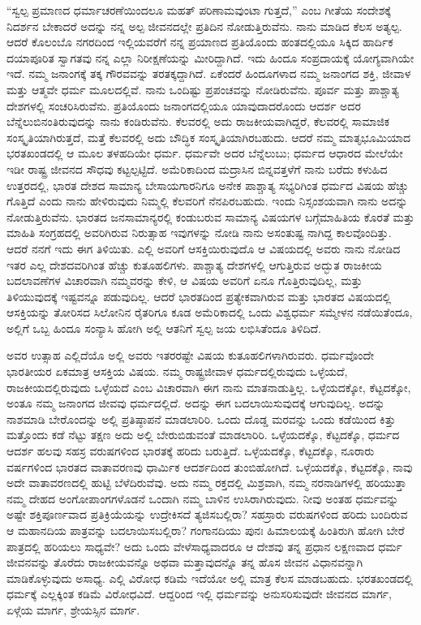 “ಸ್ವಲ್ಪ ಪ್ರಮಾಣದ ಧರ್ಮಾಚರಣೆಯಿಂದಲೂ ಮಹತ್​ ಪರಿಣಾಮವುಂಟಾ ಗುತ್ತದೆ,” ಎಂಬ ಗೀತೆಯ ಸಂದೇಶಕ್ಕೆ ನಿದರ್ಶನ ಬೇಕಾದರೆ ಅದನ್ನು ನನ್ನ ಅಲ್ಪ ಜೀವನದಲ್ಲೇ ಪ್ರತಿದಿನ ನೋಡುತ್ತಿರುವೆನು. ನಾನು ಮಾಡಿದ ಕೆಲಸ ಅತ್ಯಲ್ಪ. ಆದರೆ ಕೊಲಂಬೊ ನಗರದಿಂದ ಇಲ್ಲಿಯವರೆಗೆ ನನ್ನ ಪ್ರಯಾಣದ ಪ್ರತಿಯೊಂದು ಹಂತದಲ್ಲಿಯೂ ಸಿಕ್ಕಿದ ಹಾರ್ದಿಕ ದಯಾಪೂರಿತ ಸ್ವಾಗತವು ನನ್ನ ಎಲ್ಲಾ ನಿರೀಕ್ಷಣೆಯನ್ನು ಮೀರಿದ್ದಾಗಿದೆ. ಇದು ಹಿಂದೂ ಸಂಪ್ರದಾಯಕ್ಕೆ ಯೋಗ್ಯವಾಗಿಯೇ ಇದೆ. ನಮ್ಮ ಜನಾಂಗಕ್ಕೆ ತಕ್ಕ ಗೌರವವನ್ನು ತರತಕ್ಕದ್ದಾಗಿದೆ. ಏಕೆಂದರೆ ಹಿಂದೂಗಳಾದ ನಮ್ಮ ಜನಾಂಗದ ಶಕ್ತಿ, ಜೀವಾಳ ಮತ್ತು ಆತ್ಮವೇ ಧರ್ಮ ಮೂಲದಲ್ಲಿವೆ. ನಾನು ಒಂದಿಷ್ಟು ಪ್ರಪಂಚವನ್ನು ನೋಡಿರುವೆನು. ಪೂರ್ವ ಮತ್ತು ಪಾಶ್ಚಾತ್ಯ ದೇಶಗಳಲ್ಲಿ ಸಂಚರಿಸಿರುವೆನು. ಪ್ರತಿಯೊಂದು ಜನಾಂಗದಲ್ಲಿಯೂ ಯಾವುದಾದರೊಂದು ಆದರ್ಶ ಅದರ ಬೆನ್ನೆಲುಬಿನಂತಿರುವುದನ್ನು ನಾನು ಕಂಡಿರುವೆನು. ಕೆಲವರಲ್ಲಿ ಅದು ರಾಜಕೀಯವಾಗಿದ್ದರೆ, ಕೆಲವರಲ್ಲಿ ಸಾಮಾಜಿಕ ಸಂಸ್ಕೃತಿಯಾಗಿರುತ್ತದೆ, ಮತ್ತೆ ಕೆಲವರಲ್ಲಿ ಅದು ಬೌದ್ಧಿಕ ಸಂಸ್ಕೃತಿಯಾಗಿರಬಹುದು. ಆದರೆ ನಮ್ಮ ಮಾತೃಭೂಮಿಯಾದ ಭರತಖಂಡದಲ್ಲಿ ಆ ಮೂಲ ತಳಹದಿಯೇ ಧರ್ಮ. ಧರ್ಮವೇ ಅದರ ಬೆನ್ನೆಲುಬು; ಧರ್ಮದ ಆಧಾರದ ಮೇಲೆಯೇ ಇಡೀ ರಾಷ್ಟ್ರ ಜೀವನದ ಸೌಧವು ಕಟ್ಟಲ್ಪಟ್ಟಿದೆ. ಅಮೆರಿಕಾದಿಂದ ಮದ್ರಾಸಿನ ಬಿನ್ನವತ್ತಳೆಗೆ ನಾನು ಬರೆದು ಕಳುಹಿದ ಉತ್ತರದಲ್ಲಿ, ಭಾರತ ದೇಶದ ಸಾಮಾನ್ಯ ಬೇಸಾಯಗಾರನಿಗೂ ಅನೇಕ ಪಾಶ್ಚಾತ್ಯ ಸಭ್ಯರಿಗಿಂತ ಧರ್ಮದ ವಿಷಯ ಹೆಚ್ಚು ಗೊತ್ತಿದೆ ಎಂದು ನಾನು ಹೇಳಿರುವುದು ನಿಮ್ಮಲ್ಲಿ ಕೆಲವರಿಗೆ ನೆನಪಿರಬಹುದು. ಇಂದು ನಿಸ್ಸಂಶಯವಾಗಿ ನಾನು ಅದನ್ನು ನೋಡುತ್ತಿರುವೆನು. ಭಾರತದ ಜನಸಾಮಾನ್ಯರಲ್ಲಿ ಕಂಡುಬರುವ ಸಾಮಾನ್ಯ ವಿಷಯಗಳ ಬಗ್ಗೆ\break ಮಾಹಿತಿಯ ಕೊರತೆ ಮತ್ತು ಮಾಹಿತಿ ಸಂಗ್ರಹದಲ್ಲಿ ಅವರಿಗಿರುವ ನಿರುತ್ಸಾಹ ಇವುಗಳನ್ನು ನೋಡಿ ನಾನು ಅಸಂತುಷ್ಟ ನಾಗಿದ್ದ ಕಾಲವೊಂದಿತ್ತು. ಆದರೆ ನನಗೆ ಇದು ಈಗ ತಿಳಿಯಿತು. ಎಲ್ಲಿ ಅವರಿಗೆ ಆಸಕ್ತಿಯಿರುವುದೊ ಆ ವಿಷಯದಲ್ಲಿ ಅವರು ನಾನು ನೋಡಿದ ಇತರ ಎಲ್ಲ ದೇಶದವರಿಗಿಂತ ಹೆಚ್ಚು ಕುತೂಹಲಿಗಳು. ಪಾಶ್ಚಾತ್ಯ ದೇಶಗಳಲ್ಲಿ ಆಗುತ್ತಿರುವ ಅದ್ಭುತ ರಾಜಕೀಯ ಬದಲಾವಣೆಗಳ ವಿಚಾರವಾಗಿ ನಮ್ಮವರನ್ನು ಕೇಳಿ, ಆ ವಿಷಯ ಅವರಿಗೆ ಏನೂ ಗೊತ್ತಿರುವುದಿಲ್ಲ, ಮತ್ತು ತಿಳಿಯುವುದಕ್ಕೆ ಇಷ್ಟವನ್ನೂ ಪಡುವುದಿಲ್ಲ. ಆದರೆ ಭಾರತದಿಂದ ಪ್ರತ್ಯೇಕವಾಗಿರುವ ಮತ್ತು ಭಾರತದ ವಿಷಯದಲ್ಲಿ ಆಸಕ್ತಿಯನ್ನು ತೋರಿಸದ ಸಿಲೋನಿನ ರೈತರಿಗೂ ಕೂಡ ಅಮೆರಿಕಾದಲ್ಲಿ ಒಂದು ವಿಶ್ವಧರ್ಮ ಸಮ್ಮೇಳನ ನಡೆಯಿತೆಂದೂ, ಅಲ್ಲಿಗೆ ಒಬ್ಬ ಹಿಂದೂ ಸಂನ್ಯಾಸಿ ಹೋಗಿ ಅಲ್ಲಿ ಆತನಿಗೆ ಸ್ವಲ್ಪ ಜಯ ಲಭಿಸಿತೆಂದೂ ತಿಳಿದಿದೆ. 

ಅವರ ಉತ್ಸಾಹ ಎಲ್ಲಿದೆಯೊ ಅಲ್ಲಿ ಅವರು ಇತರರಷ್ಟೇ ವಿಷಯ ಕುತೂಹಲಿಗಳಾಗಿರುವರು. ಧರ್ಮವೊಂದೇ ಭಾರತೀಯರ ಏಕಮಾತ್ರ ಆಸಕ್ತಿಯ ವಿಷಯ. ನಮ್ಮ ರಾಷ್ಟ್ರಜೀವಾಳ ಧರ್ಮದಲ್ಲಿರುವುದು ಒಳ್ಳೆಯದೆ, ರಾಜಕೀಯದಲ್ಲಿರುವುದು ಒಳ್ಳೆಯದೆ ಎಂಬ ವಿಚಾರವಾಗಿ ಈಗ ನಾನು ಮಾತನಾಡುತ್ತಿಲ್ಲ. ಒಳ್ಳೆಯದಕ್ಕೋ, ಕೆಟ್ಟದಕ್ಕೋ, ಅಂತೂ ನಮ್ಮ ಜನಾಂಗದ ಜೀವವು ಧರ್ಮದಲ್ಲಿದೆ. ಅದನ್ನು ಈಗ ಬದಲಾಯಿಸುವುದಕ್ಕೆ ಆಗುವುದಿಲ್ಲ. ಅದನ್ನು ನಾಶಮಾಡಿ ಬೇರೊಂದನ್ನು ಅಲ್ಲಿ ಪ್ರತಿಷ್ಠಾಪನೆ ಮಾಡಲಾರಿರಿ. ಒಂದು ದೊಡ್ಡ ಮರವನ್ನು ಒಂದು ಕಡೆಯಿಂದ ಕಿತ್ತು ಮತ್ತೊಂದು ಕಡೆ ನೆಟ್ಟು ತಕ್ಷಣ ಅದು ಅಲ್ಲಿ ಬೇರುಬಿಡುವಂತೆ ಮಾಡಲಾರಿರಿ. ಒಳ್ಳೆಯದಕ್ಕೊ, ಕೆಟ್ಟದಕ್ಕೊ, ಧರ್ಮದ ಆದರ್ಶ ಹಲವು ಸಹಸ್ರ ವರುಷಗಳಿಂದ ಭಾರತಕ್ಕೆ ಹರಿದು ಬರುತ್ತಿದೆ. ಒಳ್ಳೆಯದಕ್ಕೊ, ಕೆಟ್ಟದಕ್ಕೊ, ನೂರಾರು ವರ್ಷಗಳಿಂದ ಭಾರತದ ವಾತಾವರಣವು ಧಾರ್ಮಿಕ ಆದರ್ಶದಿಂದ ತುಂಬಿಹೋಗಿದೆ. ಒಳ್ಳೆಯದಕ್ಕೊ, ಕೆಟ್ಟದಕ್ಕೊ, ನಾವು ಅದೇ ವಾತಾವರಣದಲ್ಲಿ ಹುಟ್ಟಿ ಬೆಳೆದಿರುವೆವು. ಅದು ನಮ್ಮ ರಕ್ತದಲ್ಲಿ ಮಿಶ್ರವಾಗಿ, ನಮ್ಮ ನರನಾಡಿಗಳಲ್ಲಿ ಹರಿಯುತ್ತಾ ನಮ್ಮ ದೇಹದ ಅಂಗೋಪಾಂಗಗಳೊಡನೆ ಒಂದಾಗಿ ನಮ್ಮ ಬಾಳಿನ ಉಸಿರಾಗಿರುವುದು. ನೀವು ಅಂತಹ ಧರ್ಮವನ್ನು ಅಷ್ಟೇ ಶಕ್ತಿಪೂರ್ಣವಾದ ಪ್ರತಿಕ್ರಿಯೆಯನ್ನು ಉದ್ರೇಕಿಸದೆ ತ್ಯಜಿಸಬಲ್ಲಿರಾ? ಸಹಸ್ರಾರು ವರುಷಗಳಿಂದ ಹರಿದು ಬಂದಿರುವ ಆ ಮಹಾನದಿಯ ಪಾತ್ರವನ್ನು ಬದಲಾಯಿಸಬಲ್ಲಿರಾ? ಗಂಗಾನದಿಯು ಪುನಃ ಹಿಮಾಲಯಕ್ಕೆ ಹಿಂತಿರುಗಿ ಹೋಗಿ ಬೇರೆ ಪಾತ್ರದಲ್ಲಿ ಹರಿಯಲು ಸಾಧ್ಯವೇ? ಅದು ಒಂದು ವೇಳೆ\break ಸಾಧ್ಯವಾದರೂ ಆ ದೇಶವು ತನ್ನ ಪ್ರಧಾನ ಲಕ್ಷಣವಾದ ಧರ್ಮ ಜೀವನವನ್ನು ತೊರೆದು ರಾಜಕೀಯವನ್ನೊ ಅಥವಾ ಮತ್ತಾವುದನ್ನೊ ತನ್ನ ಹೊಸ ಜೀವನ ವಿಧಾನವನ್ನಾಗಿ ಮಾಡಿಕೊಳ್ಳುವುದು ಅಸಾಧ್ಯ. ಎಲ್ಲಿ ವಿರೋಧ ಕಡಿಮೆ ಇದೆಯೋ ಅಲ್ಲಿ ಮಾತ್ರ ಕೆಲಸ ಮಾಡಬಹುದು. ಭರತಖಂಡದಲ್ಲಿ ಧರ್ಮಕ್ಕೆ ಎಲ್ಲಕ್ಕಿಂತ ಕಡಿಮೆ ವಿರೋಧವಿದೆ. ಆದ್ದರಿಂದ ಇಲ್ಲಿ ಧರ್ಮವನ್ನು ಅನುಸರಿಸುವುದೇ ಜೀವನದ ಮಾರ್ಗ, ಏಳ್ಗೆಯ ಮಾರ್ಗ, ಶ್ರೇಯಸ್ಸಿನ ಮಾರ್ಗ. 

